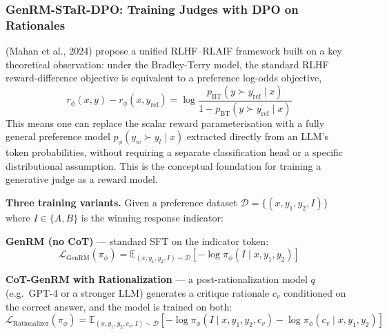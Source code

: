 \subsubsection{GenRM-STaR-DPO: Training Judges with DPO on Rationales}
\label{sec:genrm-star}

\autocite{mahan2024generativerewardmodels} (Mahan et al., 2024) propose a unified RLHF--RLAIF framework built on a key theoretical observation: under the Bradley-Terry model, the standard RLHF reward-difference objective is equivalent to a preference log-odds objective,
\begin{equation}
    r_\phi(x, y) - r_\phi(x, y_{\text{ref}}) = \log \frac{p_{\text{BT}}(y \succ y_{\text{ref}} \mid x)}{1 - p_{\text{BT}}(y \succ y_{\text{ref}} \mid x)}
    \label{eq:genrm_logodds}
\end{equation}
This means one can replace the scalar reward parameterisation with a fully general preference model $p_\phi(y_w \succ y_l \mid x)$ extracted directly from an LLM's token probabilities, without requiring a separate classification head or a specific distributional assumption. This is the conceptual foundation for training a generative judge as a reward model.

\textbf{Three training variants.} Given a preference dataset $\mathcal{D} = \{(x, y_1, y_2, I)\}$ where $I \in \{A, B\}$ is the winning response indicator:

\textbf{GenRM (no CoT)} --- standard SFT on the indicator token:
\begin{equation}
    \mathcal{L}_{\text{GenRM}}(\pi_\phi) = \mathbb{E}_{(x,y_1,y_2,I)\sim\mathcal{D}}\!\left[-\log \pi_\phi(I \mid x, y_1, y_2)\right]
    \label{eq:genrm_nochain}
\end{equation}

\textbf{CoT-GenRM with Rationalization} --- a post-rationalization model $q$ (e.g.\ GPT-4 or a stronger LLM) generates a critique rationale $c_v$ conditioned on the correct answer, and the model is trained on both:
\begin{equation}
    \mathcal{L}_{\text{Rationalizer}}(\pi_\phi) = \mathbb{E}_{(x,y_1,y_2,c_v,I)\sim\mathcal{D}}\!\left[-\log \pi_\phi(I \mid x, y_1, y_2, c_v) - \log \pi_\phi(c_v \mid x, y_1, y_2)\right]
    \label{eq:genrm_rat}
\end{equation}

